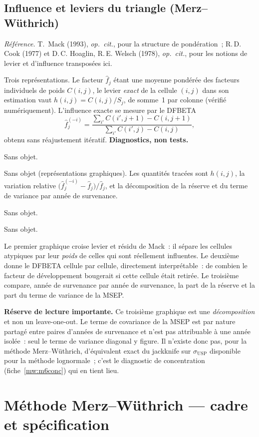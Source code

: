 \documentclass[a4paper,11pt]{article}
\newcommand{\refl}[1]{{\small\textcolor{maincolor!70!black}{\textit{Référence.} #1}}\par\smallskip}
\newcounter{ficheid}
\newenvironment{fiche}[1]{%
  \stepcounter{ficheid}%
  \phantomsection
  \subsection{#1}%
  \label{fiche:\theficheid}%
}{%
  \end{description}\vspace{0.5em}%
}
\newcommand{\Cadre}{%
  \begin{description}[leftmargin=0pt, style=unboxed, itemsep=3pt, topsep=3pt, parsep=2pt]%
  \item[\textcolor{financeblue}{\textbf{1. Cadre, notations et hypothèses de validité (non testées).}}]}
\newcommand{\Hzero}{\item[\textcolor{financeblue}{\textbf{2. Hypothèse nulle.}}]}
\newcommand{\Stat}{\item[\textcolor{financeblue}{\textbf{3. Statistique de test.}}]}
\newcommand{\Loi}{\item[\textcolor{financeblue}{\textbf{4. Loi sous $H_0$.}}]}
\newcommand{\Pval}{\item[\textcolor{financeblue}{\textbf{5. p-value.}}]}
\newcommand{\Usage}{\item[\textcolor{financeblue}{\textbf{6. Usage et limites.}}]}
\begin{document}
\begin{fiche}{Influence et leviers du triangle (Merz--Wüthrich)}
\refl{T.~Mack (1993), \emph{op.\ cit.}, pour la structure de pondération~;
R.\,D. Cook (1977) et D.\,C. Hoaglin, R.\,E. Welsch (1978), \emph{op.\ cit.},
pour les notions de levier et d'influence transposées ici.}
\Cadre
Trois représentations. Le facteur $\hat f_j$ étant une moyenne pondérée des
facteurs individuels de poids $C(i,j)$, le levier \emph{exact} de la cellule
$(i,j)$ dans son estimation vaut $h(i,j) = C(i,j)/S_j$, de somme~1 par colonne
(vérifié numériquement). L'influence exacte se mesure par le DFBETA
\[
  \hat f_j^{(-i)} = \frac{\sum_{i'} C(i',j+1) - C(i,j+1)}{\sum_{i'} C(i',j) - C(i,j)},
\]
obtenu sans réajustement itératif. \textbf{Diagnostics, non tests.}
\Hzero
Sans objet.
\Stat
Sans objet (représentations graphiques). Les quantités tracées sont $h(i,j)$, la
variation relative $\big(\hat f_j^{(-i)} - \hat f_j\big)/\hat f_j$, et la
décomposition de la réserve et du terme de variance par année de survenance.
\Loi
Sans objet.
\Pval
Sans objet.
\Usage
Le premier graphique croise levier et résidu de Mack~: il sépare les cellules
atypiques par leur \emph{poids} de celles qui sont réellement influentes. Le
deuxième donne le DFBETA cellule par cellule, directement interprétable~: de
combien le facteur de développement bougerait si cette cellule était retirée. Le
troisième compare, année de survenance par année de survenance, la part de la
réserve et la part du terme de variance de la MSEP.

\medskip
\textbf{Réserve de lecture importante.} Ce troisième graphique est une
\emph{décomposition} et non un leave-one-out. Le terme de covariance de la MSEP
est par nature partagé entre paires d'années de survenance et n'est pas
attribuable à une année isolée~: seul le terme de variance diagonal y figure.
Il n'existe donc pas, pour la méthode Merz--Wüthrich, d'équivalent exact du
jackknife sur $\sigma_{\mathrm{USP}}$ disponible pour la méthode lognormale~;
c'est le diagnostic de concentration (fiche~\ref{mw:m6conc}) qui en tient lieu.
\end{fiche}

\clearpage
\section{Méthode Merz--Wüthrich --- cadre et spécification}
\label{sec:mw}
\end{document}
